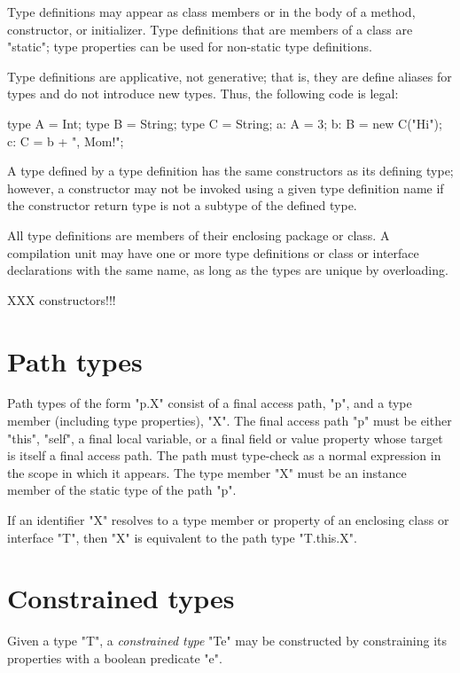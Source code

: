 Type definitions may appear as class members or in the body of a
method, constructor, or initializer.  Type definitions that are
members of a class are \xcd"static"; type properties can be used
for non-static type definitions.

Type definitions are applicative, not generative; that is, they
are define aliases for types and do not introduce new types.
Thus, the following code is legal:
\begin{xten}
type A = Int;
type B = String;
type C = String;
a: A = 3;
b: B = new C("Hi");
c: C = b + ", Mom!";
\end{xten}
A type defined by a type definition
has the same constructors as its defining type; however, a
constructor may not be invoked using a given type definition
name if the constructor return type is not a subtype of the
defined type.

All type definitions are members of their enclosing package or
class.  A compilation unit may have one or more type definitions
or class or interface declarations with the same name, as long
as the types are unique by overloading.

XXX constructors!!!

\section{Path types}

Path types of the form \xcd"p.X" consist of a final access path,
\xcd"p", and a type
member (including type properties), \xcd"X".
The final access path \xcd"p" must be either \xcd"this", \xcd"self", a final
local variable, or a final field or value property whose target
is itself a final access path.  The path must type-check 
as a normal expression in the scope in which it appears.
The type member
\xcd"X" must be an instance member of the static type of the
path \xcd"p".

If an identifier \xcd"X" resolves to a type member or property
of an enclosing class or interface \xcd"T", then \xcd"X" is equivalent to
the path type \xcd"T.this.X".

\section{Constrained types}
\label{DepType:DepType}
\label{DepTypes}
        
        Given a type \xcd"T", a {\em constrained type}
        \xcd"T{e}" may be
        constructed by constraining its properties with a
        boolean predicate \xcd"e".

